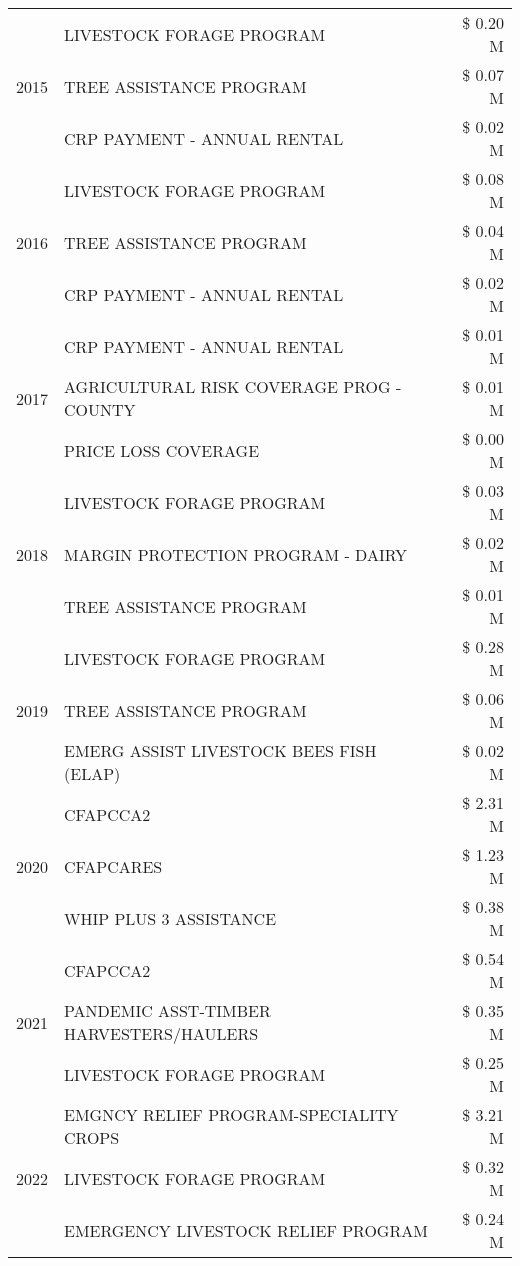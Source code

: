 \begin{tabular}{llr}
\cline{1-3}
\multirow[t]{3}{*}{2015} & LIVESTOCK FORAGE PROGRAM & \$ 0.20 M \\
 & TREE ASSISTANCE PROGRAM & \$ 0.07 M \\
 & CRP PAYMENT - ANNUAL RENTAL & \$ 0.02 M \\
\cline{1-3}
\multirow[t]{3}{*}{2016} & LIVESTOCK FORAGE PROGRAM & \$ 0.08 M \\
 & TREE ASSISTANCE PROGRAM & \$ 0.04 M \\
 & CRP PAYMENT - ANNUAL RENTAL & \$ 0.02 M \\
\cline{1-3}
\multirow[t]{3}{*}{2017} & CRP PAYMENT - ANNUAL RENTAL & \$ 0.01 M \\
 & AGRICULTURAL RISK COVERAGE PROG - COUNTY & \$ 0.01 M \\
 & PRICE LOSS COVERAGE & \$ 0.00 M \\
\cline{1-3}
\multirow[t]{3}{*}{2018} & LIVESTOCK FORAGE PROGRAM & \$ 0.03 M \\
 & MARGIN PROTECTION PROGRAM - DAIRY & \$ 0.02 M \\
 & TREE ASSISTANCE PROGRAM & \$ 0.01 M \\
\cline{1-3}
\multirow[t]{3}{*}{2019} & LIVESTOCK FORAGE PROGRAM & \$ 0.28 M \\
 & TREE ASSISTANCE PROGRAM & \$ 0.06 M \\
 & EMERG ASSIST LIVESTOCK BEES FISH (ELAP) & \$ 0.02 M \\
\cline{1-3}
\multirow[t]{3}{*}{2020} & CFAPCCA2 & \$ 2.31 M \\
 & CFAPCARES & \$ 1.23 M \\
 & WHIP PLUS 3 ASSISTANCE & \$ 0.38 M \\
\cline{1-3}
\multirow[t]{3}{*}{2021} & CFAPCCA2 & \$ 0.54 M \\
 & PANDEMIC ASST-TIMBER HARVESTERS/HAULERS & \$ 0.35 M \\
 & LIVESTOCK FORAGE PROGRAM & \$ 0.25 M \\
\cline{1-3}
\multirow[t]{3}{*}{2022} & EMGNCY RELIEF PROGRAM-SPECIALITY CROPS & \$ 3.21 M \\
 & LIVESTOCK FORAGE PROGRAM & \$ 0.32 M \\
 & EMERGENCY LIVESTOCK RELIEF PROGRAM & \$ 0.24 M \\
\cline{1-3}
\bottomrule
\end{tabular}
